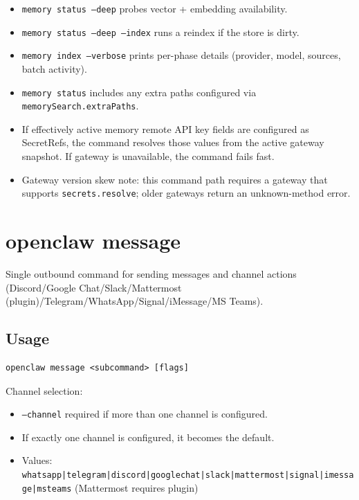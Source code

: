\begin{itemize}
  \item \texttt{memory status --deep} probes vector + embedding availability.
  \item \texttt{memory status --deep --index} runs a reindex if the store is dirty.
  \item \texttt{memory index --verbose} prints per-phase details (provider, model, sources, batch activity).
  \item \texttt{memory status} includes any extra paths configured via \texttt{memorySearch.extraPaths}.
  \item If effectively active memory remote API key fields are configured as SecretRefs, the command resolves those values from the active gateway snapshot. If gateway is unavailable, the command fails fast.
  \item Gateway version skew note: this command path requires a gateway that supports \texttt{secrets.resolve}; older gateways return an unknown-method error.
\end{itemize}



\clearpage

\section{openclaw message}


Single outbound command for sending messages and channel actions
(Discord/Google Chat/Slack/Mattermost (plugin)/Telegram/WhatsApp/Signal/iMessage/MS Teams).

\subsection{Usage}


\begin{lstlisting}
openclaw message <subcommand> [flags]
\end{lstlisting}


Channel selection:

\begin{itemize}
  \item \texttt{--channel} required if more than one channel is configured.
  \item If exactly one channel is configured, it becomes the default.
  \item Values: \texttt{whatsapp|telegram|discord|googlechat|slack|mattermost|signal|imessage|msteams} (Mattermost requires plugin)
\end{itemize}


